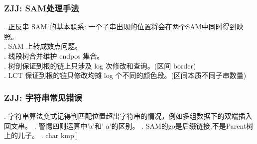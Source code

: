 \subsubsection*{ZJJ: SAM处理手法}
. 正反串 SAM 的基本联系: 一个子串出现的位置将会在两个SAM中同时得到映照。\\	
. SAM 上转成数点问题。\\	
. 线段树合并维护 endpos 集合。\\	
. 树剖保证到根的链上只涉及 log 次修改和查询。(区间 border) \\	
. LCT 保证到根的链只修改均摊 log 个不同的颜色段。(区间本质不同子串数量)

\subsubsection*{ZJJ: 字符串常见错误}
. 字符串算法变式记得判匹配位置超出字符串的情况，例如多组数据下的双端插入回文串。
. 警惕四则运算中'a'和' a'的区别。
. SAM的go是后缀链接,不是Parent树上的儿子。
. char kmp[]